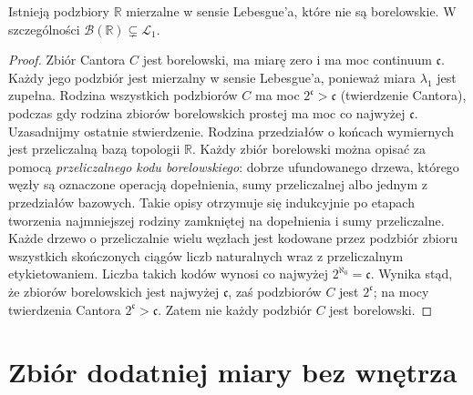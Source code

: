 \begin{wniosek}
\label{cor:nonborel-lebesgue}
Istnieją podzbiory $\mathbb R$ mierzalne w sensie
Lebesgue'a, które nie są borelowskie. W szczególności
$\mathcal B(\mathbb R)\subsetneq\mathcal L_1$.
\end{wniosek}

\begin{proof}
Zbiór Cantora $C$ jest borelowski, ma miarę zero
i ma moc continuum $\mathfrak c$.
Każdy jego podzbiór jest mierzalny w sensie Lebesgue'a,
ponieważ miara $\lambda_1$ jest zupełna.
Rodzina wszystkich podzbiorów $C$ ma moc
$2^{\mathfrak c}>\mathfrak c$ (twierdzenie Cantora),
podczas gdy rodzina zbiorów borelowskich prostej ma
moc co najwyżej $\mathfrak c$. Uzasadnijmy ostatnie
stwierdzenie. Rodzina przedziałów o końcach wymiernych
jest przeliczalną bazą topologii $\mathbb R$. Każdy
zbiór borelowski można opisać za pomocą
\emph{przeliczalnego kodu borelowskiego}: dobrze
ufundowanego drzewa, którego węzły są oznaczone
operacją dopełnienia, sumy przeliczalnej albo
jednym z przedziałów bazowych. Takie opisy otrzymuje
się indukcyjnie po etapach tworzenia najmniejszej
rodziny zamkniętej na dopełnienia i sumy przeliczalne.
Każde drzewo o przeliczalnie wielu węzłach jest
kodowane przez podzbiór zbioru wszystkich skończonych
ciągów liczb naturalnych wraz z przeliczalnym
etykietowaniem. Liczba takich kodów wynosi co najwyżej
$2^{\aleph_0}=\mathfrak c$. Wynika stąd, że zbiorów
borelowskich jest najwyżej $\mathfrak c$, zaś
podzbiorów $C$ jest $2^{\mathfrak c}$; na mocy
twierdzenia Cantora $2^{\mathfrak c}>\mathfrak c$.
Zatem nie każdy podzbiór $C$ jest borelowski.
\end{proof}

\section{Zbiór dodatniej miary bez wnętrza}

